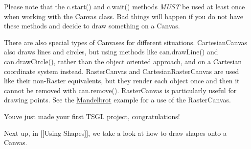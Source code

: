 Please note that the {\ttfamily c.\+start()} and {\ttfamily c.\+wait()} methods {\itshape M\+U\+ST} be used at least once when working with the Canvas class. Bad things will happen if you do not have these methods and decide to draw something on a Canvas.

There are also special types of Canvases for different situations. Cartesian\+Canvas also draws lines and circles, but using methods like {\ttfamily can.\+draw\+Line()} and {\ttfamily can.\+draw\+Circle()}, rather than the object oriented approach, and on a Cartesian coordinate system instead. Raster\+Canvas and Cartesian\+Raster\+Canvas are used like their non-\/\+Raster equivalents, but they render each object once and then it cannot be removed with {\ttfamily can.\+remove()}. Raster\+Canvas is particularly useful for drawing points. See the \mbox{\hyperlink{class_mandelbrot}{Mandelbrot}} example for a use of the Raster\+Canvas.

You\textquotesingle{}ve just made your first T\+S\+GL project, congratulations!

Next up, in \mbox{[}\mbox{[}Using Shapes\mbox{]}\mbox{]}, we take a look at how to draw shapes onto a Canvas. 